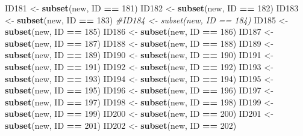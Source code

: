 \documentclass[
]{book}
\newenvironment{Shaded}{\begin{snugshade}}{\end{snugshade}}
\newcommand{\CommentTok}[1]{\textcolor[rgb]{0.56,0.35,0.01}{\textit{#1}}}
\newcommand{\DecValTok}[1]{\textcolor[rgb]{0.00,0.00,0.81}{#1}}
\newcommand{\KeywordTok}[1]{\textcolor[rgb]{0.13,0.29,0.53}{\textbf{#1}}}
\newcommand{\NormalTok}[1]{#1}
\newcommand{\OperatorTok}[1]{\textcolor[rgb]{0.81,0.36,0.00}{\textbf{#1}}}
\newcommand{\StringTok}[1]{\textcolor[rgb]{0.31,0.60,0.02}{#1}}
\begin{document}
\begin{Shaded}
\begin{Highlighting}[]
{{{{{{\NormalTok{ID181 <-}\StringTok{ }\KeywordTok{subset}\NormalTok{(new, ID }\OperatorTok{==}\StringTok{ }\DecValTok{181}\NormalTok{)}
\NormalTok{ID182 <-}\StringTok{ }\KeywordTok{subset}\NormalTok{(new, ID }\OperatorTok{==}\StringTok{ }\DecValTok{182}\NormalTok{)}
\NormalTok{ID183 <-}\StringTok{ }\KeywordTok{subset}\NormalTok{(new, ID }\OperatorTok{==}\StringTok{ }\DecValTok{183}\NormalTok{)}
\CommentTok{#ID184 <- subset(new, ID == 184)}
\NormalTok{ID185 <-}\StringTok{ }\KeywordTok{subset}\NormalTok{(new, ID }\OperatorTok{==}\StringTok{ }\DecValTok{185}\NormalTok{)}
\NormalTok{ID186 <-}\StringTok{ }\KeywordTok{subset}\NormalTok{(new, ID }\OperatorTok{==}\StringTok{ }\DecValTok{186}\NormalTok{)}
\NormalTok{ID187 <-}\StringTok{ }\KeywordTok{subset}\NormalTok{(new, ID }\OperatorTok{==}\StringTok{ }\DecValTok{187}\NormalTok{)}
\NormalTok{ID188 <-}\StringTok{ }\KeywordTok{subset}\NormalTok{(new, ID }\OperatorTok{==}\StringTok{ }\DecValTok{188}\NormalTok{)}
\NormalTok{ID189 <-}\StringTok{ }\KeywordTok{subset}\NormalTok{(new, ID }\OperatorTok{==}\StringTok{ }\DecValTok{189}\NormalTok{)}
\NormalTok{ID190 <-}\StringTok{ }\KeywordTok{subset}\NormalTok{(new, ID }\OperatorTok{==}\StringTok{ }\DecValTok{190}\NormalTok{)}
\NormalTok{ID191 <-}\StringTok{ }\KeywordTok{subset}\NormalTok{(new, ID }\OperatorTok{==}\StringTok{ }\DecValTok{191}\NormalTok{)}
\NormalTok{ID192 <-}\StringTok{ }\KeywordTok{subset}\NormalTok{(new, ID }\OperatorTok{==}\StringTok{ }\DecValTok{192}\NormalTok{)}
\NormalTok{ID193 <-}\StringTok{ }\KeywordTok{subset}\NormalTok{(new, ID }\OperatorTok{==}\StringTok{ }\DecValTok{193}\NormalTok{)}
\NormalTok{ID194 <-}\StringTok{ }\KeywordTok{subset}\NormalTok{(new, ID }\OperatorTok{==}\StringTok{ }\DecValTok{194}\NormalTok{)}
\NormalTok{ID195 <-}\StringTok{ }\KeywordTok{subset}\NormalTok{(new, ID }\OperatorTok{==}\StringTok{ }\DecValTok{195}\NormalTok{)}
\NormalTok{ID196 <-}\StringTok{ }\KeywordTok{subset}\NormalTok{(new, ID }\OperatorTok{==}\StringTok{ }\DecValTok{196}\NormalTok{)}
\NormalTok{ID197 <-}\StringTok{ }\KeywordTok{subset}\NormalTok{(new, ID }\OperatorTok{==}\StringTok{ }\DecValTok{197}\NormalTok{)}
\NormalTok{ID198 <-}\StringTok{ }\KeywordTok{subset}\NormalTok{(new, ID }\OperatorTok{==}\StringTok{ }\DecValTok{198}\NormalTok{)}
\NormalTok{ID199 <-}\StringTok{ }\KeywordTok{subset}\NormalTok{(new, ID }\OperatorTok{==}\StringTok{ }\DecValTok{199}\NormalTok{)}
\NormalTok{ID200 <-}\StringTok{ }\KeywordTok{subset}\NormalTok{(new, ID }\OperatorTok{==}\StringTok{ }\DecValTok{200}\NormalTok{)}
\NormalTok{ID201 <-}\StringTok{ }\KeywordTok{subset}\NormalTok{(new, ID }\OperatorTok{==}\StringTok{ }\DecValTok{201}\NormalTok{)}
\NormalTok{ID202 <-}\StringTok{ }\KeywordTok{subset}\NormalTok{(new, ID }\OperatorTok{==}\StringTok{ }\DecValTok{202}\NormalTok{)}

}}}}}}
\end{Highlighting}
\end{Shaded}
\end{document}
